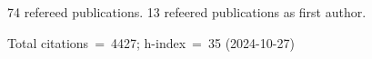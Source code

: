 74 refereed publications. 13 refeered publications as first author.

Total citations~=~4427; h-index~=~35 (2024-10-27)